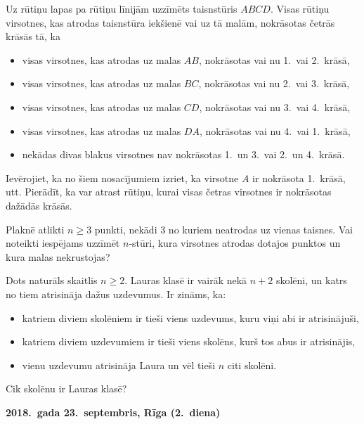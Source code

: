 \documentclass[11pt]{article}
\begin{document}
\begin{problem}[BW.TST.2018.6]
Uz rūtiņu lapas pa rūtiņu līnijām uzzīmēts taisnstūris $ABCD$. Visas rūtiņu virsotnes, kas 
atrodas taisnstūra iekšienē vai uz tā malām, nokrāsotas četrās krāsās tā, ka 
\begin{itemize}
\item visas virsotnes, kas atrodas uz malas $AB$, nokrāsotas vai nu 1.\ vai 2.\ krāsā,
\item visas virsotnes, kas atrodas uz malas $BC$, nokrāsotas vai nu 2.\ vai 3.\ krāsā, 
\item visas virsotnes, kas atrodas uz malas $CD$, nokrāsotas vai nu 3.\ vai 4.\ krāsā,
\item visas virsotnes, kas atrodas uz malas $DA$, nokrāsotas vai nu 4.\ vai 1.\ krāsā,
\item nekādas divas blakus virsotnes nav nokrāsotas 1.\ un 3.\ vai 2.\ un 4.\ krāsā.
\end{itemize}
Ievērojiet, ka no šiem nosacījumiem izriet, ka virsotne $A$ ir nokrāsota 1.\ krāsā, utt. 
Pierādīt, ka var atrast rūtiņu, kurai visas četras virsotnes ir nokrāsotas dažādās krāsās.
\end{problem}

\begin{problem}[BW.TST.2018.7]
Plaknē atlikti $n \geq 3$ punkti, nekādi $3$ no kuriem neatrodas uz vienas taisnes. Vai noteikti
iespējams uzzīmēt $n$-stūri, kura virsotnes atrodas dotajos punktos un kura malas nekrustojas?
\end{problem}

\begin{problem}[BW.TST.2018.8]
Dots naturāls skaitlis $n \geq 2$. Lauras klasē ir vairāk nekā $n+2$ skolēni, un katrs no tiem atrisināja
dažus uzdevumus. Ir zināms, ka:
\begin{itemize}
\item katriem diviem skolēniem ir tieši viens uzdevums, kuru viņi abi ir atrisinājuši,
\item katriem diviem uzdevumiem ir tieši viens skolēns, kurš tos abus ir atrisinājis,
\item vienu uzdevumu atrisināja Laura un vēl tieši $n$ citi skolēni.
\end{itemize}
Cik skolēnu ir Lauras klasē?
\end{problem}




\begin{center}
{\bf 2018.\ gada 23.\ septembris, Rīga (2.\ diena)}
\end{center}
\end{document}
